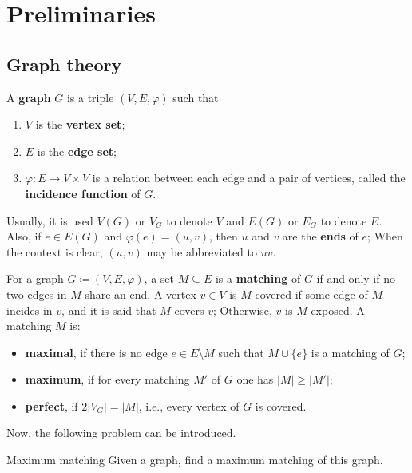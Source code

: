 \renewcommand*{\proofname}{Proof}

\chapter{Preliminaries}

\enlargethispage{.5\baselineskip}

\section{Graph theory}

\begin{definition}[Graph]
	\label{def:graph}
	A \textbf{graph} \(G\) is a triple \((V, E, \varphi)\) such that
	\begin{enumerate}[label=(\roman*)]
		\item \(V\) is the \textbf{vertex set};
		\item \(E\) is the \textbf{edge set};
		\item \(\varphi: E \to V \times V\) is a relation between each edge and a pair of vertices, called the \textbf{incidence function} of \(G\).
	\end{enumerate}
	Usually, it is used 
	\(V(G)\) or \(V_G\) to denote \(V\) and 
	\(E(G)\) or \(E_G\) to denote \(E\).
	Also, if \(e \in E(G)\) and \(\varphi(e) = (u, v)\), then \(u\) and \(v\) are the \textbf{ends} of \(e\);
	When the context is clear, \((u, v)\) may be abbreviated to \(uv\).
\end{definition}

\begin{definition}[Matching]
	\label{def:matching}
	For a graph \(G \coloneqq (V, E, \varphi)\), a set \(M \subseteq E\) is a \textbf{matching} of \(G\) if and only if no two edges in \(M\) share an end.
	A vertex \(v \in V\) is \(M\)-covered if some edge of \(M\) incides in \(v\), 
	and it is said that \(M\) covers \(v\);
	Otherwise, \(v\) is \(M\)-exposed.
	A matching \(M\) is:
	\begin{itemize}
		\item 
			\textbf{maximal}, if there is no edge \(e \in E \setminus M\) such that \(M \cup \{e\}\) is a matching of \(G\);

		\item
			\textbf{maximum}, if for every matching \(M'\) of \(G\) one has \(|M| \geq |M'|\);
	
		\item
			\textbf{perfect}, if \(2|V_G| = |M|\), i.e., every vertex of \(G\) is covered.
	\end{itemize}
	Now, the following problem can be introduced.
	\\
\end{definition}
\begin{problem}{Maximum matching}
	Given a graph, find a maximum matching of this graph.
\end{problem}

